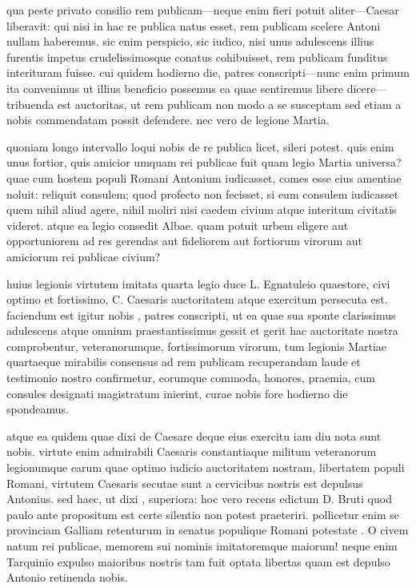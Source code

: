  qua peste privato consilio rem publicam—neque enim fieri potuit aliter—Caesar liberavit: qui nisi in hac re publica natus esset, rem publicam scelere Antoni nullam haberemus. sic enim perspicio, sic iudico, nisi unus adulescens illius furentis impetus crudelissimosque conatus cohibuisset, rem publicam funditus interituram fuisse. cui quidem hodierno die, patres conscripti—nunc enim primum ita convenimus ut illius beneficio possemus ea quae sentiremus libere dicere— tribuenda est auctoritas, ut rem publicam non modo a se susceptam sed etiam a nobis commendatam possit defendere. nec vero de legione Martia.

 quoniam longo intervallo loqui nobis de re publica licet, sileri potest. quis enim unus fortior, quis amicior umquam rei publicae fuit quam legio Martia universa? quae cum hostem populi Romani Antonium iudicasset, comes esse eius amentiae noluit: reliquit consulem; quod profecto non fecisset, si eum consulem iudicasset quem nihil aliud agere, nihil moliri nisi caedem civium atque interitum civitatis videret. atque ea legio consedit Albae. quam potuit urbem eligere aut opportuniorem ad res gerendas aut fideliorem aut fortiorum virorum aut amiciorum rei publicae civium?

 huius legionis virtutem imitata quarta legio duce L. Egnatuleio quaestore, civi optimo et fortissimo, C. Caesaris auctoritatem atque exercitum persecuta est. faciendum est igitur nobis , patres conscripti, ut ea quae sua sponte clarissimus adulescens atque omnium praestantissimus gessit et gerit hac auctoritate nostra comprobentur, veteranorumque, fortissimorum virorum, tum legionis Martiae quartaeque mirabilis consensus ad rem publicam recuperandam laude et testimonio nostro confirmetur, eorumque commoda, honores, praemia, cum consules designati magistratum inierint, curae nobis fore hodierno die spondeamus.

 atque ea quidem quae dixi de Caesare deque eius exercitu iam diu nota sunt nobis. virtute enim admirabili Caesaris constantiaque militum veteranorum legionumque earum quae optimo iudicio auctoritatem nostram, libertatem populi Romani, virtutem Caesaris secutae sunt a cervicibus nostris est depulsus Antonius. sed haec, ut dixi , superiora: hoc vero recens edictum D. Bruti quod paulo ante propositum est certe silentio non potest praeteriri. pollicetur enim se provinciam Galliam retenturum in senatus populique Romani potestate . O civem natum rei publicae, memorem sui nominis imitatoremque maiorum! neque enim Tarquinio expulso maioribus nostris tam fuit optata libertas quam est depulso Antonio retinenda nobis.

